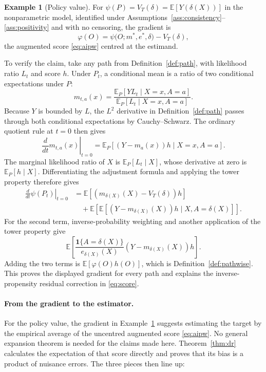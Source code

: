 \documentclass[11pt,a4paper]{article}
\theoremstyle{plain}
\theoremstyle{definition}
\newtheorem{example}[theorem]{Example}
\theoremstyle{remark}
\newcommand{\E}{\mathbb E}
\newcommand{\one}[1]{\mathbf 1\{#1\}}
\begin{document}
\begin{example}[Policy value]\label{ex:if-value}
For $\psi(P)=V_T(\delta)=\E[Y(\delta(X))]$ in the nonparametric model, identified under
Assumptions~\ref{ass:consistency}--\ref{ass:positivity} and with no censoring, the gradient is
\[
\varphi(O)=\psi\bigl(O;m^\ast,e^\ast,\delta\bigr)-V_T(\delta),
\]
the augmented score \eqref{eq:aipw} centred at the estimand.

To verify the claim, take any path from Definition~\ref{def:path}, with likelihood ratio $L_t$
and score $h$. Under $P_t$, a conditional mean is a ratio of two conditional expectations under
$P$:
\[
m_{t,a}(x)
=\frac{\E_P[Y L_t\mid X=x,A=a]}{\E_P[L_t\mid X=x,A=a]}.
\]
Because $Y$ is bounded by $L$, the $L^2$ derivative in Definition~\ref{def:path} passes through
both conditional expectations by Cauchy--Schwarz. The ordinary quotient rule at $t=0$ then gives
\[
\left.\frac{d}{dt}m_{t,a}(x)\right|_{t=0}
=\E_P[(Y-m_a(x))h\mid X=x,A=a].
\]
The marginal likelihood ratio of $X$ is $\E_P[L_t\mid X]$, whose derivative at zero is
$\E_P[h\mid X]$. Differentiating the adjustment formula and applying the tower property
therefore gives
\begin{align*}
\left.\frac{d}{dt}\psi(P_t)\right|_{t=0}
&=\E[(m_{\delta(X)}(X)-V_T(\delta))h]\\
&\quad+\E\!\left[\E[(Y-m_{\delta(X)}(X))h\mid X,A=\delta(X)]\right].
\end{align*}
For the second term, inverse-probability weighting and another application of the tower property
give
\[
\E\!\left[
\frac{\one{A=\delta(X)}}{e_{\delta(X)}(X)}
(Y-m_{\delta(X)}(X))h
\right].
\]
Adding the two terms is $\E[\varphi(O)h(O)]$, which is
Definition~\ref{def:pathwise}. This proves the displayed gradient for every path and explains
the inverse-propensity residual correction in \eqref{eq:score}.
\end{example}

\paragraph{From the gradient to the estimator.}
For the policy value, the gradient in Example~\ref{ex:if-value} suggests estimating the target
by the empirical average of the uncentred augmented score \eqref{eq:aipw}. No general expansion
theorem is needed for the claims made here. Theorem~\ref{thm:dr} calculates the expectation of
that score directly and proves that its bias is a product of nuisance errors. The three pieces
then line up:
\end{document}
